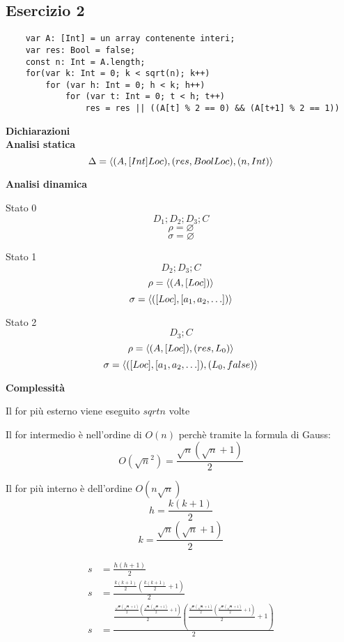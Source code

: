 \documentclass{article}
\begin{document}
\pagebreak

\subsection{Esercizio 2}
\begin{verbatim}
    var A: [Int] = un array contenente interi;
    var res: Bool = false;
    const n: Int = A.length;
    for(var k: Int = 0; k < sqrt(n); k++)
        for (var h: Int = 0; h < k; h++)
            for (var t: Int = 0; t < h; t++)
                res = res || ((A[t] % 2 == 0) && (A[t+1] % 2 == 1))
\end{verbatim}

\textbf{Dichiarazioni} \\
\textbf{Analisi statica}
\[\Delta = \langle (A, [Int]Loc), (res, BoolLoc), (n, Int) \rangle\]

\textbf{Analisi dinamica}

Stato 0
\[D_1;D_2;D_3;C\]
\[\rho = \varnothing\]
\[\sigma = \varnothing\]

Stato 1
\[D_2;D_3;C\]
\[\rho = \langle (A, [Loc]) \rangle\]
\[\sigma = \langle ([Loc], [a_1,a_2,\ldots]) \rangle\]

Stato 2
\[D_3;C\]
\[\rho = \langle (A, [Loc]), (res, L_0) \rangle\]
\[\sigma = \langle ([Loc], [a_1,a_2,\ldots]), (L_0, false) \rangle\]


\textbf{Complessità}

Il for più esterno viene eseguito \(sqrt{n}\) volte

Il for intermedio è nell'ordine di \(O(n)\) perchè tramite la formula di Gauss:
\[O\left(\sqrt{n}^2\right) = \frac{\sqrt{n}(\sqrt{n} + 1)}{2}\]

Il for più interno è dell'ordine \(O(n\sqrt{n})\)
\[h = \frac{k\left(k + 1\right)}{2}\]
\[k = \frac{\sqrt{n}\left(\sqrt{n} + 1\right)}{2}\]

\begin{align*}
    s &= \frac{h(h + 1)}{2} \\
    s &= \frac{\frac{k\left(k + 1\right)}{2}(\frac{k\left(k + 1\right)}{2} + 1)}{2} \\
    s &= \frac{
            \frac{
                \frac{\sqrt{n}\left(\sqrt{n} + 1\right)}{2}
                \left(
                    \frac{\sqrt{n}\left(\sqrt{n} + 1\right)}{2} + 1
                \right)
            }
            {2}
            \left(
                \frac{
                    \frac{\sqrt{n}\left(\sqrt{n} + 1\right)}{2}
                    \left(
                        \frac{\sqrt{n}\left(\sqrt{n} + 1\right)}{2} + 1
                    \right)
                    }{2} + 1 
            \right)
        }
        {2}
\end{align*}
\end{document}

